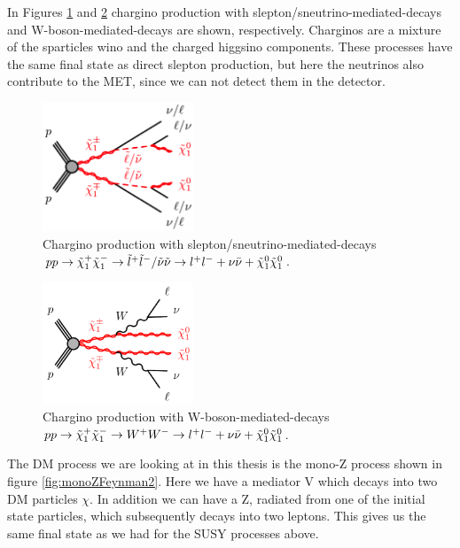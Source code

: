 In Figures \ref{fig:SlepSnuFeynman} and \ref{fig:WWFeynman} chargino production with slepton/sneutrino-mediated-decays and W-boson-mediated-decays are shown, respectively. Charginos are a mixture of the sparticles wino and the charged higgsino components. These processes have the same final state as direct slepton production, but here the neutrinos also contribute to the MET, since we can not detect them in the detector. 
\begin{figure}[H]
    \centering
    \includegraphics[width = 0.4\textwidth]{Figures/FeynmanDiagrams/SlepSnuFeynman.png}
    \caption{Chargino production with slepton/sneutrino-mediated-decays $pp \rightarrow \tilde{\chi}_1^+ \tilde{\chi}_1^- \rightarrow \tilde{l}^+ \tilde{l}^- /\tilde{\nu} \tilde{\nu} \rightarrow l^+l^- + \nu \Bar{\nu} + \tilde{\chi}_1^0 \tilde{\chi}_1^0$.}
    \label{fig:SlepSnuFeynman}
\end{figure}

\begin{figure}[H]
    \centering
    \includegraphics[width = 0.4\textwidth]{Figures/FeynmanDiagrams/WWFeynman.png}
    \caption{Chargino production with W-boson-mediated-decays $pp \rightarrow \tilde{\chi}_1^+ \tilde{\chi}_1^- \rightarrow W^+ W^- \rightarrow l^+l^- + \nu \Bar{\nu} + \tilde{\chi}_1^0 \tilde{\chi}_1^0$.}
    \label{fig:WWFeynman}
\end{figure}

The DM process we are looking at in this thesis is the mono-Z process shown in figure \ref{fig:monoZFeynman2}. Here we have a mediator V which decays into two DM particles $\chi$. In addition we can have a Z, radiated from one of the initial state particles, which subsequently decays into two leptons. This gives us the same final state as we had for the SUSY processes above.  

